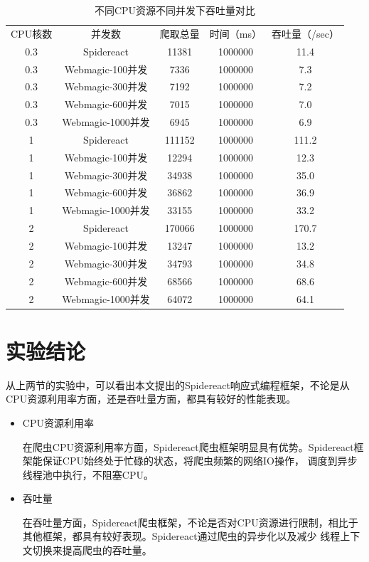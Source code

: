 \documentclass[master]{njuthesis}
\begin{document}
\begin{table}
\centering
\begin{tabular}{|c|c|c|c|c|}
\hline
CPU核数& 并发数 & 爬取总量 & 时间（ms） & 吞吐量（/sec） \\
0.3 & Spidereact & 11381 & 1000000 & 11.4 \\
0.3 & Webmagic-100并发 & 7336 & 1000000 & 7.3 \\
0.3 & Webmagic-300并发 & 7192 & 1000000 & 7.2 \\
0.3 & Webmagic-600并发 & 7015 & 1000000 & 7.0 \\
0.3 & Webmagic-1000并发 & 6945 & 1000000 & 6.9 \\
1 & Spidereact & 111152 & 1000000 & 111.2 \\
1 & Webmagic-100并发 & 12294 & 1000000 & 12.3 \\
1 & Webmagic-300并发 & 34938 & 1000000 & 35.0 \\
1 & Webmagic-600并发 & 36862 & 1000000 & 36.9 \\
1 & Webmagic-1000并发 & 33155 & 1000000 &  33.2 \\
2 & Spidereact & 170066 & 1000000 & 170.7 \\
2 & Webmagic-100并发 & 13247 & 1000000 & 13.2 \\
2 & Webmagic-300并发 & 34793 & 1000000 & 34.8 \\
2 & Webmagic-600并发 & 68566 & 1000000 & 68.6 \\
2 & Webmagic-1000并发 & 64072 & 1000000 & 64.1 \\

\hline
\end{tabular}
\caption{不同CPU资源不同并发下吞吐量对比}\label{table:limit}
\end{table}

\section{实验结论}
从上两节的实验中，可以看出本文提出的Spidereact响应式编程框架，不论是从CPU资源利用率方面，还是吞吐量方面，都具有较好的性能表现。

\begin{itemize}
  \item CPU资源利用率

  在爬虫CPU资源利用率方面，Spidereact爬虫框架明显具有优势。Spidereact框架能保证CPU始终处于忙碌的状态，将爬虫频繁的网络IO操作，
  调度到异步线程池中执行，不阻塞CPU。
  \item 吞吐量

  在吞吐量方面，Spidereact爬虫框架，不论是否对CPU资源进行限制，相比于其他框架，都具有较好表现。Spidereact通过爬虫的异步化以及减少
  线程上下文切换来提高爬虫的吞吐量。
\end{itemize}
\end{document}
